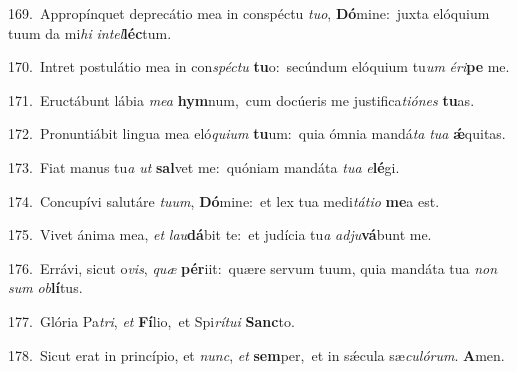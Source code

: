 {\numbfont\textcolor{\numbcolor}{169.}}~Appropínquet deprecátio mea in conspéctu \textit{tu}\-\textit{o}, \textbf{Dó}\-mine:~\star juxta elóquium tuum da mi\textit{hi} \textit{in}\-\textit{tel}\textbf{léc}tum.\par
{\numbfont\textcolor{\numbcolor}{170.}}~Intret postulátio mea in con\-\textit{spéc}\-\textit{tu} \textbf{tu}\-o:~\star secúndum elóquium tu\textit{um} \textit{é}\-\textit{ri}\textbf{pe} me.\par
{\numbfont\textcolor{\numbcolor}{171.}}~Eructábunt lábia \textit{me}\-\textit{a} \textbf{hym}\-num,~\star cum docúeris me justifica\-\textit{ti}\-\textit{ó}\textit{nes} \textbf{tu}\-as.\par
{\numbfont\textcolor{\numbcolor}{172.}}~Pronuntiábit lingua mea eló\-\textit{qui}\-\textit{um} \textbf{tu}\-um:~\star quia ómnia mandá\textit{ta} \textit{tu}\-\textit{a} \textbf{ǽ}\-quitas.\par
{\numbfont\textcolor{\numbcolor}{173.}}~Fiat manus tu\textit{a} \textit{ut} \textbf{sal}\-vet me:~\star quóniam mandáta \textit{tu}\-\textit{a} \textit{e}\-\textbf{lé}gi.\par
{\numbfont\textcolor{\numbcolor}{174.}}~Concupívi salutáre \textit{tu}\-\textit{um}, \textbf{Dó}\-mine:~\star et lex tua medi\-\textit{tá}\-\textit{ti}\textit{o} \textbf{me}\-a est.\par
{\numbfont\textcolor{\numbcolor}{175.}}~Vivet ánima mea, \textit{et} \textit{lau}\-\textbf{dá}bit te:~\star et judícia tu\textit{a} \textit{ad}\-\textit{ju}\textbf{vá}bunt me.\par
{\numbfont\textcolor{\numbcolor}{176.}}~Errávi, sicut o\-\textit{vis}\-, \textit{quæ} \textbf{pér}\-iit:~\star quære servum tuum, quia mandáta tua \textit{non} \textit{sum} \textit{ob}\-\textbf{lí}tus.\par
{\numbfont\textcolor{\numbcolor}{177.}}~Glória Pa\-\textit{tri}\-, \textit{et} \textbf{Fí}\-lio,~\star et Spi\-\textit{rí}\-\textit{tu}\textit{i} \textbf{Sanc}\-to.\par
{\numbfont\textcolor{\numbcolor}{178.}}~Sicut erat in princípio, et \textit{nunc}\-, \textit{et} \textbf{sem}\-per,~\star et in sǽcula sæ\-\textit{cu}\-\textit{ló}\textit{rum}. \textbf{A}\-men.\par
